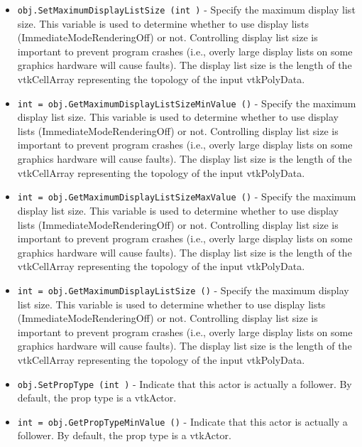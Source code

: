 \begin{itemize}
\item  \verb|obj.SetMaximumDisplayListSize (int )| -  Specify the maximum display list size. This variable is used to determine
 whether to use display lists (ImmediateModeRenderingOff) or not. 
 Controlling display list size is important to prevent program crashes (i.e.,
 overly large display lists on some graphics hardware will cause faults).
 The display list size is the length of the vtkCellArray representing the
 topology of the input vtkPolyData.

\item  \verb|int = obj.GetMaximumDisplayListSizeMinValue ()| -  Specify the maximum display list size. This variable is used to determine
 whether to use display lists (ImmediateModeRenderingOff) or not. 
 Controlling display list size is important to prevent program crashes (i.e.,
 overly large display lists on some graphics hardware will cause faults).
 The display list size is the length of the vtkCellArray representing the
 topology of the input vtkPolyData.

\item  \verb|int = obj.GetMaximumDisplayListSizeMaxValue ()| -  Specify the maximum display list size. This variable is used to determine
 whether to use display lists (ImmediateModeRenderingOff) or not. 
 Controlling display list size is important to prevent program crashes (i.e.,
 overly large display lists on some graphics hardware will cause faults).
 The display list size is the length of the vtkCellArray representing the
 topology of the input vtkPolyData.

\item  \verb|int = obj.GetMaximumDisplayListSize ()| -  Specify the maximum display list size. This variable is used to determine
 whether to use display lists (ImmediateModeRenderingOff) or not. 
 Controlling display list size is important to prevent program crashes (i.e.,
 overly large display lists on some graphics hardware will cause faults).
 The display list size is the length of the vtkCellArray representing the
 topology of the input vtkPolyData.

\item  \verb|obj.SetPropType (int )| -  Indicate that this actor is actually a follower. By default, the prop
 type is a vtkActor.

\item  \verb|int = obj.GetPropTypeMinValue ()| -  Indicate that this actor is actually a follower. By default, the prop
 type is a vtkActor.


\end{itemize}
